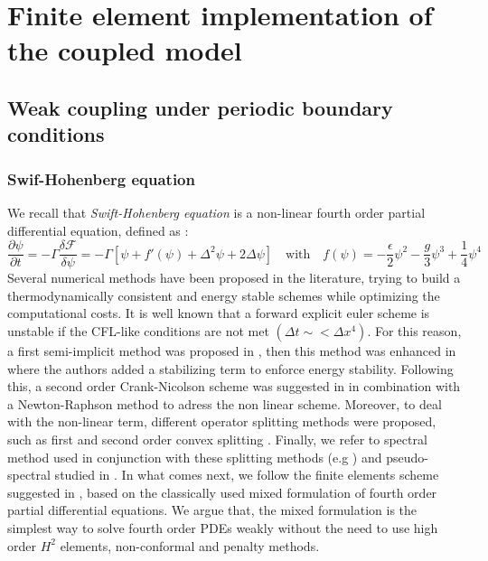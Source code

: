 \documentclass{article}
\begin{document}
\section{Finite element implementation of the coupled model}
\subsection{Weak coupling under periodic boundary conditions}
\subsubsection{Swif-Hohenberg equation}
We recall that \textit{Swift-Hohenberg equation} is a non-linear fourth order partial differential equation, defined as :
\begin{equation}\label{eq:SH4th}
   \frac{\partial \psi}{\partial t} = - \Gamma \frac{\delta \mathcal{F}}{\delta \psi} = - \Gamma \left[ \psi + f'(\psi) + \Delta^2 \psi +2 \Delta \psi  \right] \quad \text{with} \quad f(\psi) = -\frac{\epsilon}{2} \psi^2 - \frac{g}{3}\psi^3 + \frac{1}{4} \psi^4
\end{equation}
Several numerical methods have been proposed in the literature, trying to build a thermodynamically consistent and energy stable schemes while optimizing the computational costs.
It is well known that a forward explicit euler scheme is unstable if the CFL-like conditions are not met $(\Delta t\sim < \Delta x^4)$. For this reason, a first semi-implicit method was proposed in \cite{chengEfficientAlgorithmSolving2008}, then this method was enhanced in \cite{elseySimpleEfficientScheme2013} where the authors added a stabilizing term to enforce energy stability. Following this, a second order Crank-Nicolson scheme was suggested in \cite{gomezNewSpaceTime2012} in combination with a Newton-Raphson method to adress the non linear scheme. Moreover, to deal with the non-linear term, different operator splitting methods were proposed, such as first and second order convex splitting \cite{huStableEfficientFinitedifference2009}. Finally, we refer to spectral method used in conjunction with these splitting methods (e.g \cite{leeSemianalyticalFourierSpectral2017}) and pseudo-spectral studied in \cite{zhaiStabilityErrorEstimate2021}.
In what comes next, we follow the finite elements scheme suggested in \cite{qiNumericalAnalysisSecondorder2024}, based on the classically used mixed formulation of fourth order partial differential equations. We argue that, the mixed formulation is the simplest way to solve fourth order PDEs weakly without the need to use high order $H^2$ elements, non-conformal and penalty methods. \\
\end{document}
